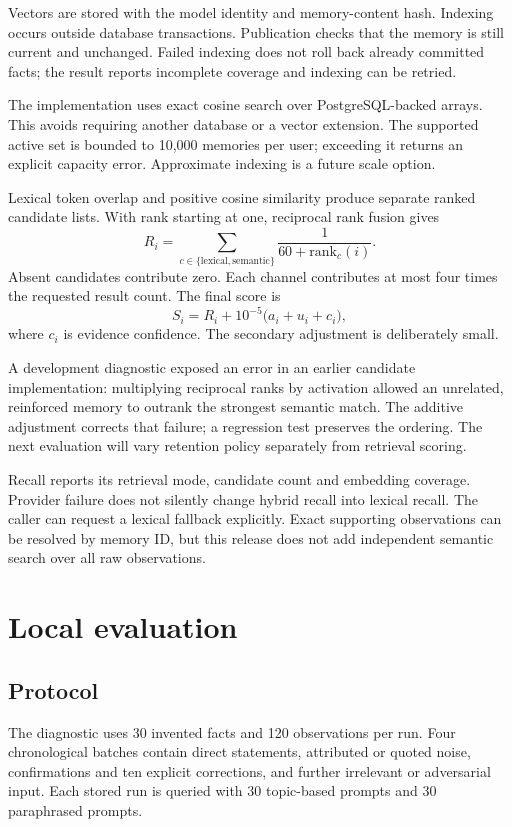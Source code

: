 \documentclass[11pt]{article}
\begin{document}
Vectors are stored with the model identity and memory-content hash. Indexing occurs outside database transactions. Publication checks that the memory is still current and unchanged. Failed indexing does not roll back already committed facts; the result reports incomplete coverage and indexing can be retried.

The implementation uses exact cosine search over PostgreSQL-backed arrays. This avoids requiring another database or a vector extension. The supported active set is bounded to 10,000 memories per user; exceeding it returns an explicit capacity error. Approximate indexing is a future scale option.

Lexical token overlap and positive cosine similarity produce separate ranked candidate lists. With rank starting at one, reciprocal rank fusion gives
\[
R_i=\sum_{c \in \{\mathrm{lexical},\mathrm{semantic}\}}
\frac{1}{60+\mathrm{rank}_c(i)}.
\]
Absent candidates contribute zero. Each channel contributes at most four times the requested result count. The final score is
\[
S_i=R_i+10^{-5}\bigl(a_i+u_i+c_i\bigr),
\]
where $c_i$ is evidence confidence. The secondary adjustment is deliberately small.

A development diagnostic exposed an error in an earlier candidate implementation: multiplying reciprocal ranks by activation allowed an unrelated, reinforced memory to outrank the strongest semantic match. The additive adjustment corrects that failure; a regression test preserves the ordering. The next evaluation will vary retention policy separately from retrieval scoring.

Recall reports its retrieval mode, candidate count and embedding coverage. Provider failure does not silently change hybrid recall into lexical recall. The caller can request a lexical fallback explicitly. Exact supporting observations can be resolved by memory ID, but this release does not add independent semantic search over all raw observations.

\section{Local evaluation}
\subsection{Protocol}
The diagnostic uses 30 invented facts and 120 observations per run. Four chronological batches contain direct statements, attributed or quoted noise, confirmations and ten explicit corrections, and further irrelevant or adversarial input. Each stored run is queried with 30 topic-based prompts and 30 paraphrased prompts.
\end{document}
